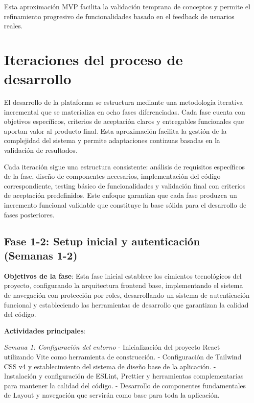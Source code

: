\documentclass[12pt,a4paper,oneside]{report}
\begin{document}
Esta aproximación MVP facilita la validación temprana de conceptos y permite el refinamiento progresivo de funcionalidades basado en el feedback de usuarios reales.

\section{Iteraciones del proceso de
desarrollo}\label{iteraciones-del-proceso-de-desarrollo}

El desarrollo de la plataforma se estructura mediante una metodología iterativa incremental que se materializa en ocho fases diferenciadas. Cada fase cuenta con objetivos específicos, criterios de aceptación claros y entregables funcionales que aportan valor al producto final. Esta aproximación facilita la gestión de la complejidad del sistema y permite adaptaciones continuas basadas en la validación de resultados.

Cada iteración sigue una estructura consistente: análisis de requisitos específicos de la fase, diseño de componentes necesarios, implementación del código correspondiente, testing básico de funcionalidades y validación final con criterios de aceptación predefinidos. Este enfoque garantiza que cada fase produzca un incremento funcional validable que constituye la base sólida para el desarrollo de fases posteriores.

\subsection{Fase 1-2: Setup inicial y autenticación (Semanas
1-2)}\label{fase-1-2-setup-inicial-y-autenticaciuxf3n-semanas-1-2}

\textbf{Objetivos de la fase}: Esta fase inicial establece los cimientos tecnológicos del proyecto, configurando la arquitectura frontend base, implementando el sistema de navegación con protección por roles, desarrollando un sistema de autenticación funcional y estableciendo las herramientas de desarrollo que garantizan la calidad del código.

\textbf{Actividades principales}:

\emph{Semana 1: Configuración del entorno} - Inicialización del proyecto React utilizando Vite como herramienta de construcción. - Configuración de Tailwind CSS v4 y establecimiento del sistema de diseño base de la aplicación. - Instalación y configuración de ESLint, Prettier y herramientas complementarias para mantener la calidad del código. - Desarrollo de componentes fundamentales de Layout y navegación que servirán como base para toda la aplicación.
\end{document}
